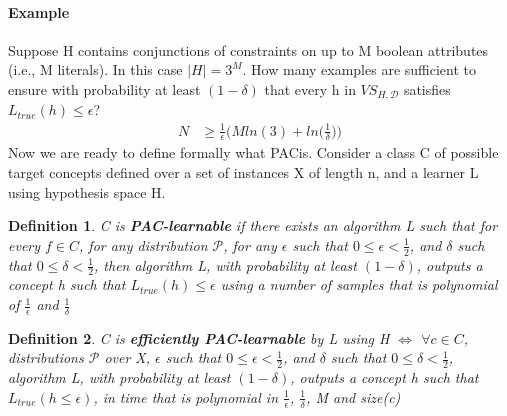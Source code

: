\documentclass[main.tex]{subfiles}
\newtheorem{definition}{Definition}[section]
\begin{document}
\paragraph{Example} Suppose H contains conjunctions of constraints on up to M boolean attributes (i.e., M literals). In this case $|H|=3^M$. How many examples are sufficient to ensure with probability at least $(1-\delta)$ that every h in $VS_{H,\mathcal{D}}$ satisfies $L_{true}(h) \leq \epsilon$?
\begin{align*}
    N & \geq \frac{1}{\epsilon} \bigg( Mln(3) + ln \bigg( \frac{1}{\delta} \bigg) \bigg)
\end{align*}
\newline
Now we are ready to define formally what PAC\footnotemark is. Consider a class C of possible target concepts defined over a set of instances X of length n, and a learner L using hypothesis space H. 
\begin{definition}
    C is \textbf{PAC-learnable} if there exists an algorithm L such that for every $f \in C$, for any distribution $\mathcal{P}$, for any $\epsilon$ such that $0 \leq \epsilon < \frac{1}{2}$, and $\delta$ such that $0 \leq \delta < \frac{1}{2}$, then algorithm L, with probability at least $(1-\delta)$, outputs a concept h such that $L_{true}(h) \leq \epsilon$ using a number of samples that is polynomial of $\frac{1}{\epsilon}$ and $\frac{1}{\delta}$
\end{definition}
\begin{definition}
    C is \textbf{efficiently PAC-learnable} by L using H $\iff$ $\forall c \in C$, distributions $\mathcal{P}$ over X, $\epsilon$ such that $0 \leq \epsilon < \frac{1}{2}$, and $\delta$ such that $0 \leq \delta < \frac{1}{2}$, algorithm L, with probability at least $(1-\delta)$, outputs a concept h such that $L_{true}(h \leq \epsilon)$, in time that is polynomial in $\frac{1}{\epsilon}$, $\frac{1}{\delta}$, M and size(c)\footnotemark
\end{definition} 
\end{document}

